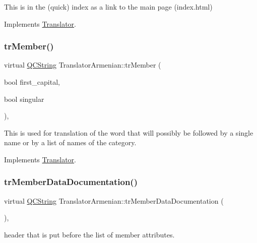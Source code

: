 This is in the (quick) index as a link to the main page (index.\+html) 

Implements \mbox{\hyperlink{class_translator}{Translator}}.

\mbox{\label{class_translator_armenian_a2fc2b522d83a3f5a72411d9de9b59664}} 
\subsubsection{\texorpdfstring{trMember()}{trMember()}}
{\footnotesize\ttfamily virtual \mbox{\hyperlink{class_q_c_string}{Q\+C\+String}} Translator\+Armenian\+::tr\+Member (\begin{DoxyParamCaption}\item[{bool}]{first\+\_\+capital,  }\item[{bool}]{singular }\end{DoxyParamCaption})\hspace{0.3cm}{\ttfamily [inline]}, {\ttfamily [virtual]}}

This is used for translation of the word that will possibly be followed by a single name or by a list of names of the category. 

Implements \mbox{\hyperlink{class_translator}{Translator}}.

\mbox{\label{class_translator_armenian_a19f17abf7fb643c3f5e6ddffee6a768c}} 
\subsubsection{\texorpdfstring{trMemberDataDocumentation()}{trMemberDataDocumentation()}}
{\footnotesize\ttfamily virtual \mbox{\hyperlink{class_q_c_string}{Q\+C\+String}} Translator\+Armenian\+::tr\+Member\+Data\+Documentation (\begin{DoxyParamCaption}{ }\end{DoxyParamCaption})\hspace{0.3cm}{\ttfamily [inline]}, {\ttfamily [virtual]}}

header that is put before the list of member attributes. 

